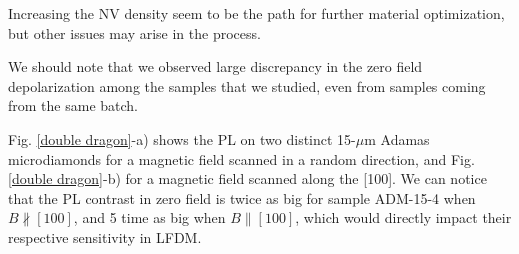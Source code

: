 \documentclass[a4paper,11pt]{report}
\begin{document}
Increasing the NV density seem to be the path for further material optimization, but other issues may arise in the process.

We should note that we observed large discrepancy in the zero field depolarization among the samples that we studied, even from samples coming from the same batch.

%
%
%



Fig. \ref{double dragon}-a) shows the PL on two distinct 15-$\mu$m Adamas microdiamonds for a magnetic field scanned in a random direction, and Fig. \ref{double dragon}-b) for a magnetic field scanned along the [100]. We can notice that the PL contrast in zero field is twice as big for sample ADM-15-4 when $B \nparallel [100]$, and 5 time as big when $B \parallel [100]$, which would directly impact their respective sensitivity in LFDM.
\end{document}
